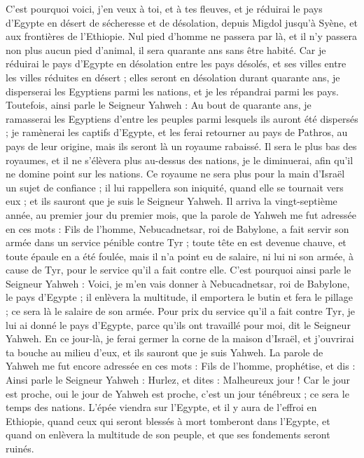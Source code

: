 \begin{multicols}{2}
C'est pourquoi voici, j'en veux à toi, et à tes fleuves, et je réduirai le pays d'Egypte en désert de sécheresse et de désolation, depuis Migdol jusqu'à Syène, et aux frontières de l'Ethiopie.
Nul pied d'homme ne passera par là, et il n'y passera non plus aucun pied d'animal, il sera quarante ans sans être habité.
Car je réduirai le pays d'Egypte en désolation entre les pays désolés, et ses villes entre les villes réduites en désert ; elles seront en désolation durant quarante ans, je disperserai les Egyptiens parmi les nations, et je les répandrai parmi les pays.
Toutefois, ainsi parle le Seigneur Yahweh : Au bout de quarante ans, je ramasserai les Egyptiens d'entre les peuples parmi lesquels ils auront été dispersés ;
je ramènerai les captifs d'Egypte, et les ferai retourner au pays de Pathros, au pays de leur origine, mais ils seront là un royaume rabaissé.
Il sera le plus bas des royaumes, et il ne s'élèvera plus au-dessus des nations, je le diminuerai, afin qu'il ne domine point sur les nations.
Ce royaume ne sera plus pour la main d'Israël un sujet de confiance ; il lui rappellera son iniquité, quand elle se tournait vers eux ; et ils sauront que je suis le Seigneur Yahweh.
Il arriva la vingt-septième année, au premier jour du premier mois, que la parole de Yahweh me fut adressée en ces mots :
Fils de l'homme, Nebucadnetsar, roi de Babylone, a fait servir son armée dans un service pénible contre Tyr ; toute tête en est devenue chauve, et toute épaule en a été foulée, mais il n'a point eu de salaire, ni lui ni son armée, à cause de Tyr, pour le service qu'il a fait contre elle.
C'est pourquoi ainsi parle le Seigneur Yahweh : Voici, je m'en vais donner à Nebucadnetsar, roi de Babylone, le pays d'Egypte ; il enlèvera la multitude, il emportera le butin et fera le pillage ; ce sera là le salaire de son armée.
Pour prix du service qu'il a fait contre Tyr, je lui ai donné le pays d'Egypte, parce qu'ils ont travaillé pour moi, dit le Seigneur Yahweh.
En ce jour-là, je ferai germer la corne de la maison d'Israël, et j'ouvrirai ta bouche au milieu d'eux, et ils sauront que je suis Yahweh.
\VerseOne{}La parole de Yahweh me fut encore adressée en ces mots :
Fils de l'homme, prophétise, et dis : Ainsi parle le Seigneur Yahweh : Hurlez, et dites : Malheureux jour !
Car le jour est proche, oui le jour de Yahweh est proche, c'est un jour ténébreux ; ce sera le temps des nations.
L'épée viendra sur l'Egypte, et il y aura de l'effroi en Ethiopie, quand ceux qui seront blessés à mort tomberont dans l'Egypte, et quand on enlèvera la multitude de son peuple, et que ses fondements seront ruinés.

\end{multicols}
